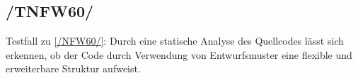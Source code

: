 \subsection*{/TNFW60/}

\label{/TNFW60/} Testfall zu \ref{/NFW60/}: Durch eine \gls{statische Analyse} des \Gls{Quellcode}s lässt sich erkennen, ob der Code durch Verwendung von Entwurfsmuster eine flexible und erweiterbare Struktur aufweist.
